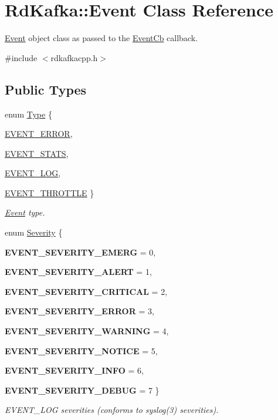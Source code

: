 \hypertarget{classRdKafka_1_1Event}{
\section{RdKafka::Event Class Reference}
\label{classRdKafka_1_1Event}
}


\hyperlink{classRdKafka_1_1Event}{Event} object class as passed to the \hyperlink{classRdKafka_1_1EventCb}{EventCb} callback.  


{\ttfamily \#include $<$rdkafkacpp.h$>$}\subsection*{Public Types}
\begin{DoxyCompactItemize}
\item 
enum \hyperlink{classRdKafka_1_1Event_ab087b57a8ddf5c46d722999a010b8f25}{Type} \{ \par
\hyperlink{classRdKafka_1_1Event_ab087b57a8ddf5c46d722999a010b8f25a735af2a296b96a5a80c49fbd8ceb1e72}{EVENT\_\-ERROR}, 
\par
\hyperlink{classRdKafka_1_1Event_ab087b57a8ddf5c46d722999a010b8f25ad3f00ea86b21113eff51499c3815b2f6}{EVENT\_\-STATS}, 
\par
\hyperlink{classRdKafka_1_1Event_ab087b57a8ddf5c46d722999a010b8f25af13151bd09f1313ea1e521a3d85e56e3}{EVENT\_\-LOG}, 
\par
\hyperlink{classRdKafka_1_1Event_ab087b57a8ddf5c46d722999a010b8f25ac0b85460c3d63bfd5fe0b2d76eb52112}{EVENT\_\-THROTTLE}
 \}
\begin{DoxyCompactList}\small\item\em \hyperlink{classRdKafka_1_1Event}{Event} type. \item\end{DoxyCompactList}\item 
enum \hyperlink{classRdKafka_1_1Event_a97aab314006c6c1a82dcd341e5c0e6d3}{Severity} \{ \par
{\bfseries EVENT\_\-SEVERITY\_\-EMERG} =  0, 
\par
{\bfseries EVENT\_\-SEVERITY\_\-ALERT} =  1, 
\par
{\bfseries EVENT\_\-SEVERITY\_\-CRITICAL} =  2, 
\par
{\bfseries EVENT\_\-SEVERITY\_\-ERROR} =  3, 
\par
{\bfseries EVENT\_\-SEVERITY\_\-WARNING} =  4, 
\par
{\bfseries EVENT\_\-SEVERITY\_\-NOTICE} =  5, 
\par
{\bfseries EVENT\_\-SEVERITY\_\-INFO} =  6, 
\par
{\bfseries EVENT\_\-SEVERITY\_\-DEBUG} =  7
 \}
\begin{DoxyCompactList}\small\item\em EVENT\_\-LOG severities (conforms to syslog(3) severities). \item\end{DoxyCompactList}\end{DoxyCompactItemize}
